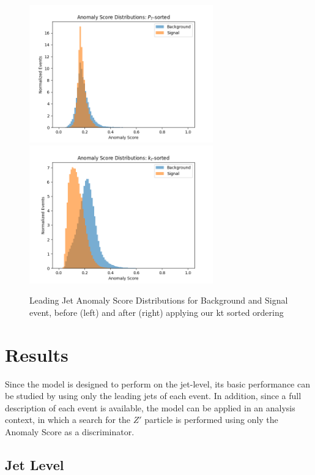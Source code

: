 \documentclass[12pt, a4paper]{article}
\begin{document}
\begin{figure}[H]
	\begin{center}
		\includegraphics[width=225pt]{imgs/Anom_Score_CompPt.png}
		\includegraphics[width=225pt]{imgs/score_comp.png}
	\end{center}
	\caption{Leading Jet Anomaly Score Distributions for Background and Signal event, before (left) and after (right) applying our kt sorted ordering}
	\label{fig:score_comp}
\end{figure}



\section{Results}

 Since the model is designed to perform on the jet-level, its basic performance can be studied by using only the leading jets of each event. In addition, since a full description of each event is available, the model can be applied in an analysis context, in which a search for the $Z'$ particle is performed using only the Anomaly Score as a discriminator.


\subsection{Jet Level}
\end{document}
